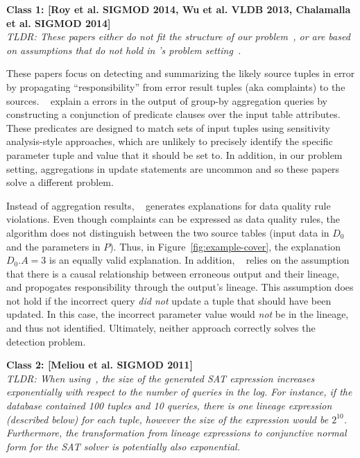 \noindent \textbf{Class 1: [Roy et al. SIGMOD 2014, Wu et al. VLDB 2013, Chalamalla et al. SIGMOD 2014]} \\

{\it
TLDR: These papers either do not fit the structure of our problem~\cite{Wu13,roy2014formal}, or 
are based on assumptions that do not hold in \sys's problem setting~\cite{chalamalla2014}.
}


These papers focus on detecting and summarizing the likely source tuples in error by
propagating ``responsibility'' from error result tuples (aka complaints) to the sources.
~\cite{Wu13,roy2014formal} explain a errors in the output of group-by aggregation queries by constructing 
a conjunction of predicate clauses over the input table attributes. 
These predicates are designed to match sets of input tuples using sensitivity analysis-style approaches, which are unlikely to precisely identify the specific parameter tuple and value that it should be set to.
In addition, in our problem setting, aggregations in update statements are uncommon and so these papers solve a different problem.

Instead of aggregation results, ~\cite{chalamalla2014} generates explanations for data quality rule violations. 
Even though complaints can be expressed as data quality rules, the algorithm does not distinguish between the two source tables (input data in $D_0$ and the parameters in $P$).
Thus, in Figure~\ref{fig:example-cover}, the explanation $D_0.A = 3$ is an equally valid explanation. 
In addition, ~\cite{chalamalla2014} relies on the assumption that there is a causal relationship between erroneous output and their lineage, and propogates responsibility through the output's lineage.
This assumption does not hold if the incorrect query {\it did not} update a tuple that should have been updated.  In this case, the incorrect parameter value would {\it not} be in the lineage, and thus not identified. Ultimately, neither approach correctly solves the detection problem.


\bigskip
\noindent \textbf{Class 2: [Meliou et al. SIGMOD 2011]} \\

{\it TLDR: When using~\cite{meliou2011tracing}, the size of the generated SAT expression 
increases exponentially with respect to the number of queries in the log. 
For instance, if the database contained 100 tuples and 10 queries, there is one lineage expression (described below) for each tuple, 
however the size of the expression would be $2^{10}$.  
Furthermore, the transformation from lineage expressions to conjunctive normal form for the SAT solver is potentially also exponential. 
}

